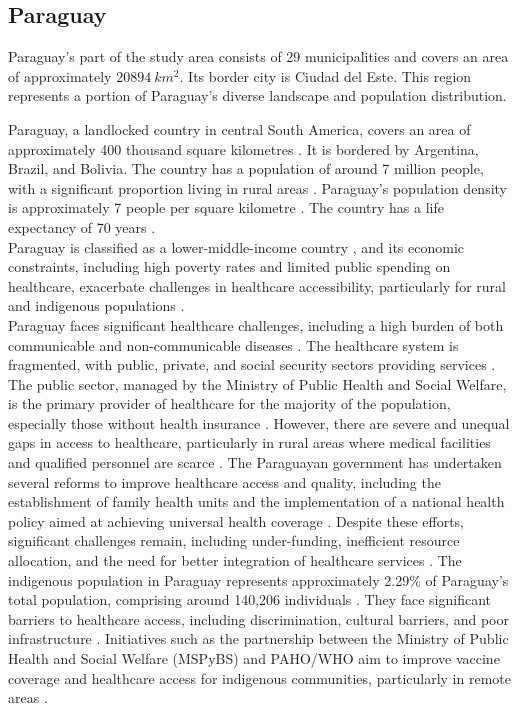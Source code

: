 \documentclass[11pt, a4paper]{report}
\begin{document}
\subsection{Paraguay}

Paraguay's part of the study area consists of  29 municipalities and covers an area of approximately $20894 \ km^2$. Its border city is Ciudad del Este. This region represents a portion of Paraguay's diverse landscape and population distribution.

Paraguay, a landlocked country in central South America, covers an area of approximately 400 thousand square kilometres \citep{runfola_geoboundaries_2020}. It is bordered by Argentina, Brazil, and Bolivia. The country has a population of around 7 million people, with a significant proportion living in rural areas \citep{united_nations_world_2022}. Paraguay's population density is approximately 7 people per square kilometre \citep{united_nations_world_2022}. The country has a life expectancy of 70 years \citep{world_bank_life_2022}. \\
%
Paraguay is classified as a lower-middle-income country \citep{world_bank_world_2022}, and its economic constraints, including high poverty rates and limited public spending on healthcare, exacerbate challenges in healthcare accessibility, particularly for rural and indigenous populations \citep{world_health_organization_access_2024}. \\
%
Paraguay faces significant healthcare challenges, including a high burden of both communicable and non-communicable diseases \citep{amnesty_international_usa_paraguay_2024}. The healthcare system is fragmented, with public, private, and social security sectors providing services \citep{oecd_-depth_2018}. The public sector, managed by the Ministry of Public Health and Social Welfare, is the primary provider of healthcare for the majority of the population, especially those without health insurance \citep{oecd_-depth_2018}. However, there are severe and unequal gaps in access to healthcare, particularly in rural areas where medical facilities and qualified personnel are scarce \citep{capurro_socioeconomic_2022}. The Paraguayan government has undertaken several reforms to improve healthcare access and quality, including the establishment of family health units and the implementation of a national health policy aimed at achieving universal health coverage \citep{oecd_reforming_2019}. Despite these efforts, significant challenges remain, including under-funding, inefficient resource allocation, and the need for better integration of healthcare services \citep{oecd_reforming_2019}. 
%
The indigenous population in Paraguay represents approximately 2.29\% of Paraguay's total population, comprising around 140,206 individuals \citep{berger_indigenous_2024}. They face significant barriers to healthcare access, including discrimination, cultural barriers, and poor infrastructure \citep{berger_indigenous_2024}. Initiatives such as the partnership between the Ministry of Public Health and Social Welfare (MSPyBS) and PAHO/WHO aim to improve vaccine coverage and healthcare access for indigenous communities, particularly in remote areas \citep{world_health_organization_access_2024}.
\end{document}
